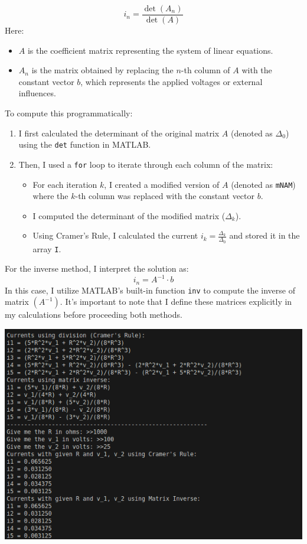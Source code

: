 \documentclass[a4paper, 12pt]{report}
\newcommand{\code}[1]{\colorbox{light-gray}{\texttt{#1}}}
\def\link{blue!50!black}
\begin{document}
\[i_n = \frac{\det(A_n)}{\det(A)}\]
Here:
\begin{itemize}[itemsep=-1mm]
    \item \(A\) is the coefficient matrix representing the system of linear equations.
    \item \(A_n\) is the matrix obtained by replacing the \(n\)-th column of \(A\) with the constant vector \(b\), which represents the applied voltages or external influences.
\end{itemize}
To compute this programmatically:
\begin{enumerate}[itemsep=-1mm]
    \item I first calculated the determinant of the original matrix \(A\) (denoted as \(\Delta_0\)) using the \code{det} function in MATLAB.
    \item Then, I used a \code{for} loop to iterate through each column of the matrix:
    \begin{itemize}[itemsep=-1mm]
        \item For each iteration \(k\), I created a modified version of \(A\) (denoted as \texttt{mNAM}) where the \(k\)-th column was replaced with the constant vector \(b\).
        \item I computed the determinant of the modified matrix (\(\Delta_k\)).
        \item Using Cramer's Rule, I calculated the current \(i_k = \frac{\Delta_k}{\Delta_0}\) and stored it in the array \texttt{I}.
    \end{itemize}
\end{enumerate}
For the inverse method, I interpret the solution as:
\[i_n = A^{-1} \cdot b\]
In this case, I utilize MATLAB's built-in function \code{inv} to compute the inverse of matrix \((A^{-1})\). It’s important to note that I define these matrices explicitly in my calculations before proceeding both methods.


\begin{center}
    \includegraphics[width=1\textwidth]{main/graphs_images/4screen.png}
\end{center}
\end{document}
